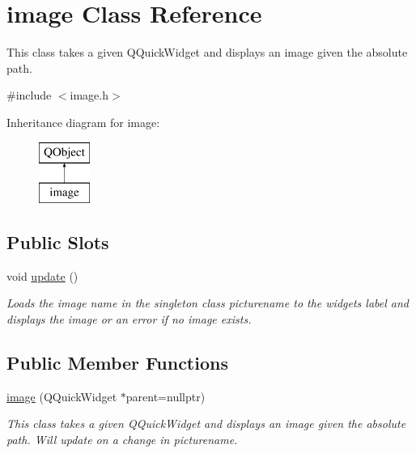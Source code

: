 \hypertarget{classimage}{}\section{image Class Reference}
\label{classimage}


This class takes a given Q\+Quick\+Widget and displays an image given the absolute path.  




{\ttfamily \#include $<$image.\+h$>$}

Inheritance diagram for image\+:\begin{figure}[H]
\begin{center}
\leavevmode
\includegraphics[height=2.000000cm]{classimage}
\end{center}
\end{figure}
\subsection*{Public Slots}
\begin{DoxyCompactItemize}
\item 
void \mbox{\hyperlink{classimage_aa5f8271e58a9264d5f6a931e6d216f8d}{update}} ()
\begin{DoxyCompactList}\small\item\em Loads the image name in the singleton class picturename to the widget\textquotesingle{}s label and displays the image or an error if no image exists. \end{DoxyCompactList}\end{DoxyCompactItemize}
\subsection*{Public Member Functions}
\begin{DoxyCompactItemize}
\item 
\mbox{\hyperlink{classimage_ab150836a04739566de187f967d657d7d}{image}} (Q\+Quick\+Widget $\ast$parent=nullptr)
\begin{DoxyCompactList}\small\item\em This class takes a given Q\+Quick\+Widget and displays an image given the absolute path. Will update on a change in picturename. \end{DoxyCompactList}\end{DoxyCompactItemize}
